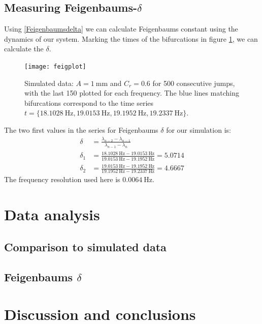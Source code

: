 \documentclass[12pt,oneside,a4paper]{article}
\numberwithin{equation}{section}
\begin{document}
{{{{\subsection{Measuring Feigenbaums-$\delta$}
Using \eqref{Feigenbaumsdelta} we can calculate Feigenbaums constant using the dynamics of our system. Marking the times of the bifurcations in figure  \ref{feigsim}, we can calculate the $\delta$.
\begin{figure}[h]
\centering
\texttt{[image: feigplot]} 
\caption{Simulated data: $A=\SI{1}{\mm}$ and $C_r=\num{0.6}$ for 500 consecutive jumps, with the last 150 plotted for each frequency. The blue lines matching bifurcations correspond to the time series $t=\{\SI{18.1028}{\hertz},\SI{19.0153}{\hertz},\SI{19.1952}{\hertz},\SI{19.2337}{\hertz} \}$.}\label{feigsim}
\end{figure}
The two first values in the series for Feigenbaums $\delta$ for our simulation is:
\begin{align*}
\delta&=\frac{\lambda_{n-2} - \lambda_{n-1}}{\lambda_{n-1}-\lambda_n}\\
\delta_1&=\frac{\SI{18.1028}{\hertz}-\SI{19.0153}{\hertz}}{\SI{19.0153}{\hertz}-\SI{19.1952}{\hertz}} = 5.0714\\
\delta_2&=\frac{\SI{19.0153}{\hertz}-\SI{19.1952}{\hertz}}{\SI{19.1952}{\hertz}-\SI{19.2337}{\hertz}} = 4.6667
\end{align*}
The frequency resolution used here is $\SI{0.0064}{\hertz}$.
\section{Data analysis}
\subsection{Comparison to simulated data}
\subsection{Feigenbaums $\delta$}
\section{Discussion and conclusions}
\newpage



\newpage
\appendix
}}}}
\end{document}
